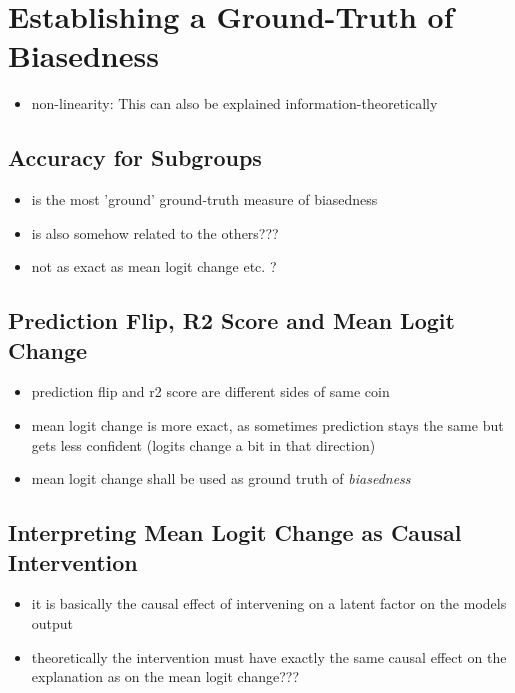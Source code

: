 \section{Establishing a Ground-Truth of Biasedness}
\begin{itemize}
    \item non-linearity: This can also be explained information-theoretically 
\end{itemize}

\subsection{Accuracy for Subgroups}
\begin{itemize}
    \item is the most 'ground' ground-truth measure of biasedness
    \item is also somehow related to the others??? 
    \item not as exact as mean logit change etc. ?
\end{itemize}

\subsection{Prediction Flip, R2 Score and Mean Logit Change}
\begin{itemize}
    \item prediction flip and r2 score are different sides of same coin
    \item mean logit change is more exact, as sometimes prediction stays the same but gets less confident (logits change a bit in that direction)
    \item mean logit change shall be used as ground truth of \textit{biasedness}
\end{itemize}

\subsection{Interpreting Mean Logit Change as Causal Intervention}
\begin{itemize}
    \item it is basically the causal effect of intervening on a latent factor on the models output
    \item theoretically the intervention must have exactly the same causal effect on the explanation as on the mean logit change???
\end{itemize}


